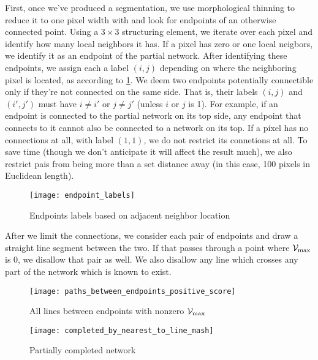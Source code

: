 First, once we've produced a segmentation, we use morphological thinning to reduce it to one pixel width with \autocite{thinning} and look for endpoints of an otherwise connected point. Using a $3\times 3$ structuring element, we iterate over each pixel and identify how many local neighbors it has. If a pixel has zero or one local neigbors, we identify it as an endpoint of the partial network. After identifying these endpoints, we assign each a label $(i,j)$ depending on where the neighboring pixel is located, as according to \cref{fig:endpoint_labels}. We deem two endpoints potentially connectible only if they're not connected on the same side. That is, their labels $(i,j)$ and $(i',j')$ must have $i\ne i'$ or $j\ne j'$ (unless $i$ or $j$ is 1). For example, if an endpoint is connected to the partial network on its top side, any endpoint that connects to it cannot also be connected to a network on its top. If a pixel has no connections at all, with label $(1,1)$, we do not restrict its connetions at all. To save time (though we don't anticipate it will affect the result much), we also restrict pais from being more than a set distance away (in this case, 100 pixels in Euclidean length).

\begin{figure}
	\centering
	\texttt{[image: endpoint\_labels]}
	\caption{Endpoints labels based on adjacent neighbor location}
	\label{fig:endpoint_labels}
\end{figure}

After we limit the connections, we consider each pair of endpoints and draw a straight line segment between the two. If that passes through a point where $\mathcal{V}_{\max}$ is 0, we disallow that pair as well. We also disallow any line which crosses any part of the network which is known to exist.
\begin{figure}[p]
	\texttt{[image: paths\_between\_endpoints\_positive\_score]}
	\caption{All lines between endpoints with nonzero $\mathcal{V}_{\max}$}
	\label{fig:network-completion-connected-pairs}
\end{figure}
\begin{figure}[p] \centering
	\texttt{[image: completed\_by\_nearest\_to\_line\_mash]}
	\caption{Partially completed network}
	\label{fig:network-completion-end-result}
\end{figure}

